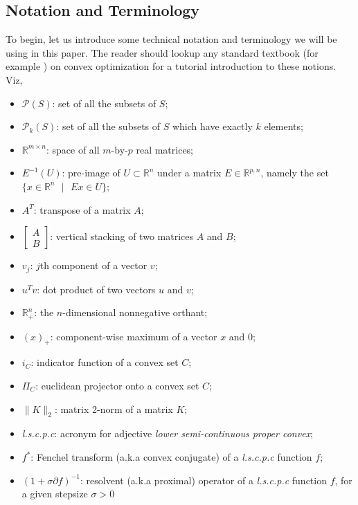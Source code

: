 \documentclass[a4paper,9pt,journal]{IEEEtran}
\begin{document}
\subsection{Notation and Terminology}
To begin, let us introduce some technical notation and terminology we will be using in this paper. The reader should lookup any standard textbook
(for example \cite{boyd2004}) on convex optimization for a tutorial introduction to these notions. Viz,
\begin{itemize}
\item $\mathcal{P}(S)$: \quad set of all the subsets of $S$;
\item $\mathcal{P}_k(S)$: \quad set of all the subsets of $S$ which have exactly $k$ elements;
\item $\mathbb{R}^{m \times n}$: \quad space of all $m$-by-$p$ real matrices;
\item $E^{-1}(U)$: \quad pre-image of $U \subset \mathbb{R}^n$ under a matrix $E \in \mathbb{R}^{p,n}$,
namely the set $\{x \in \mathbb{R}^n\text{ }| \text{ }Ex \in U\}$;
\item $A^T$: \quad transpose of a matrix $A$;
\item $\begin{bmatrix}A\\B\end{bmatrix}$: \quad vertical stacking of two matrices $A$ and $B$;
\item $v_j$: \quad $j$th component of  a vector $v$;
\item $u^Tv$: \quad dot product of two vectors $u$ and $v$;
\item $\mathbb{R}^n_+$: \quad the $n$-dimensional nonnegative orthant;
\item $(x)_+$: \quad component-wise maximum of a vector $x$ and 0;
\item $i_C$: \quad indicator function of a convex set $C$;
\item $\Pi_C$: \quad euclidean projector onto a convex set $C$;
\item $\|K\|_2$: \quad matrix 2-norm of a matrix $K$;
\item \textit{l.s.c.p.c}: \quad acronym for adjective \textit{lower semi-continuous proper convex};
\item $f^*$: \quad Fenchel transform (a.k.a convex conjugate) of a \textit{l.s.c.p.c} function $f$;
\item $(1 + \sigma \partial f)^{-1}$: resolvent (a.k.a proximal) operator of a \textit{l.s.c.p.c} function $f$, for a given stepsize $\sigma > 0$
\end{itemize}
\end{document}
